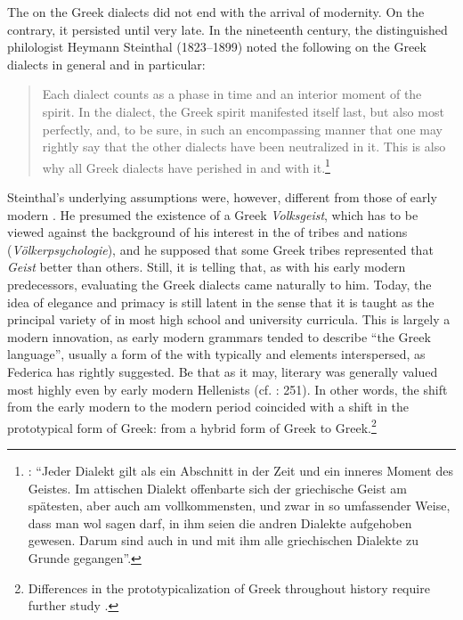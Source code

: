 The  on the Greek dialects did not end with the arrival of modernity. On the contrary, it persisted until very late. In the nineteenth century, the distinguished  philologist Heymann Steinthal (1823–1899) noted the following on the Greek dialects in general and  in particular:

\begin{quote}
Each dialect counts as a phase in time and an interior moment of the spirit. In the  dialect, the Greek spirit manifested itself last, but also most perfectly, and, to be sure, in such an encompassing manner that one may rightly say that the other dialects have been neutralized in it. This is also why all Greek dialects have perished in and with it.\footnote{\citet[9]{Steinthal1891}: “Jeder Dialekt gilt als ein Abschnitt in der Zeit und ein inneres Moment des Geistes. Im attischen Dialekt offenbarte sich der griechische Geist am spätesten, aber auch am vollkommensten, und zwar in so umfassender Weise, dass man wol sagen darf, in ihm seien die andren Dialekte aufgehoben gewesen. Darum sind auch in und mit ihm alle griechischen Dialekte zu Grunde gegangen”.}
\end{quote}

Steinthal’s underlying assumptions were, however, different from those of early modern . He presumed the existence of a Greek \textit{Volksgeist}, which has to be viewed against the background of his interest in the  of tribes and nations (\textit{Völkerpsychologie}), and he supposed that some Greek tribes represented that \textit{Geist} better than others. Still, it is telling that, as with his early modern predecessors, evaluating the Greek dialects came naturally to him. Today, the idea of  elegance and primacy is still latent in the sense that it is taught as the principal variety of  in most high school and university curricula. This is largely a modern innovation, as early modern grammars tended to describe “the Greek language”, usually a form of the  with typically  and  elements interspersed, as Federica \citet[123]{Ciccolella2008} has rightly suggested. Be that as it may, literary  was generally valued most highly even by early modern Hellenists (cf. \citealt{Roelcke2014}: 251). In other words, the shift from the early modern to the modern period coincided with a shift in the prototypical form of Greek: from a hybrid form of  Greek to  Greek.\footnote{Differences in the prototypicalization of Greek throughout history require further study \citep[105--106]{VanRooyFcb}.}

